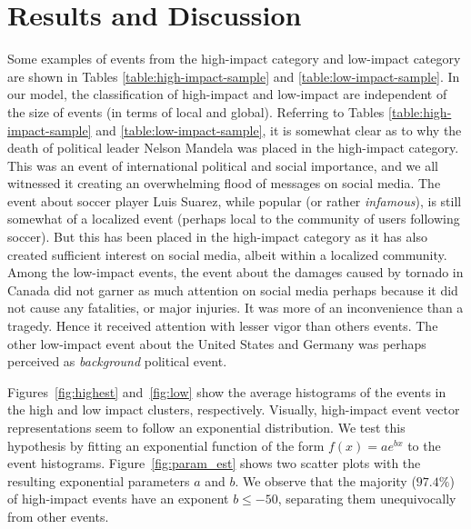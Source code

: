\documentclass[10pt,letterpaper]{article}
\begin{document}
\section*{Results and Discussion}
Some examples of events from the high-impact category and low-impact category
are shown in Tables \ref{table:high-impact-sample} and \ref{table:low-impact-sample}.
In our model, the classification of high-impact and low-impact are independent of 
the size of events (in terms of local and global).  Referring to Tables \ref{table:high-impact-sample}
and \ref{table:low-impact-sample}, it is somewhat clear as to why
the death of political leader Nelson Mandela was placed in the high-impact category.
This was an event of international political and social importance, and we all witnessed it 
creating an overwhelming flood of messages on social media.
The event about soccer player Luis Suarez, while popular (or rather \emph{infamous}),
is still somewhat of a localized event (perhaps local to the community of users following soccer).
But this has been placed in the high-impact category as it has also created sufficient interest
on social media, albeit within a localized community.
Among the low-impact events, the event about the damages caused by tornado in Canada did not garner as much attention
on social media perhaps because it did not cause any fatalities, or major injuries.  It was more
of an inconvenience than a tragedy.  Hence it received attention with lesser vigor than
others events.  The other low-impact event about the United States and Germany was perhaps 
perceived as \emph{background} political event.

Figures~\ref{fig:highest} and~\ref{fig:low} show the average
histograms of the events in the high and low impact clusters, respectively.
Visually, high-impact event vector representations seem to follow an
exponential distribution. We test this hypothesis by fitting an
exponential function of the form $f(x)=ae^{bx}$ to the event
histograms. Figure~\ref{fig:param_est} shows two scatter
plots with the resulting exponential parameters $a$ and $b$. 
We observe that the majority ($97.4\%$) of
high-impact events have an exponent $b \leq -50$, separating them
unequivocally from other events.


\end{document}
